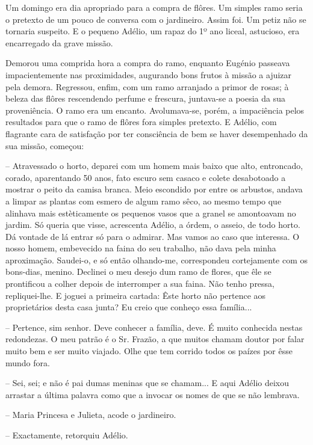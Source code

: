\documentclass[9pt]{article}
\begin{document}

Um domingo era dia apropriado para a compra de flôres. Um simples
ramo seria o pretexto de um pouco de conversa com o jardineiro. Assim
foi. Um petiz não se tornaria suspeito. E o pequeno Adélio, um rapaz do
1º ano liceal, astucioso, era encarregado da grave missão.

Demorou uma comprida hora a compra do ramo, enquanto Eugé\-nio passeava impacientemente nas proximidades, augurando bons frutos à missão
a ajuizar pela demora. Regressou, enfim, com um ramo arranjado a primor
de rosas; à beleza das flôres rescendendo perfume e frescura,
juntava-se a poesia da sua proveniência. O ramo era um encanto. Avolumava-se, porém, a impaciência pelos resultados para que o ramo de flôres fora simples pretexto. E Adélio, com flagrante cara de satisfa\-ção
por ter consciência de bem se haver desempenhado da sua missão, começou:

-- Atravessado o horto, deparei com um homem mais baixo que alto,
entroncado, corado, aparentando 50 anos, fato escuro sem casaco e colete desabotoado a mostrar o peito da camisa branca. Meio escondido
por entre os arbustos, andava a limpar as plantas com esmero de algum
ramo sêco, ao mesmo tempo que alinhava mais estèticamente os pequenos
vasos que a granel se amontoavam no jardim. Só queria que visse, acrescenta Adélio, a órdem, o asseio, de todo horto. Dá vontade de lá entrar
só para o admirar. Mas vamos ao caso que interessa. O nosso homem, embevecido na faina do seu traba\-lho, não dava pela minha aproxima\-ção. Saudei-o, e só então o\-lhando-me, correspondeu cortejamente com os bons-dias,
menino. Declinei o meu desejo dum ramo de flores, que êle se prontificou a co\-lher depois de interromper a sua faina. Não tenho pressa, repliquei-\-lhe. E joguei a primeira cartada: Êste horto não pertence aos proprietários desta casa junta? Eu creio que conheço essa fa\-mí\-lia...

-- Pertence, sim senhor. Deve conhecer a fa\-mí\-lia, deve. É muito conhecida nestas redondezas. O meu patrão é o Sr. Frazão, a que muitos
chamam doutor por falar muito bem e ser muito viajado. O\-lhe que tem
corrido todos os paízes por êsse mundo fora.

-- Sei, sei; e não é pai dumas meninas que se chamam... E aqui Adélio deixou arrastar a última palavra como que a invocar os nomes de
que se não lembrava.

-- Maria Princesa e Julieta, acode o jardineiro.

-- Exactamente, retorquiu Adélio.
\end{document}
